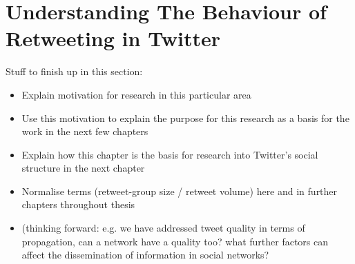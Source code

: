 \chapter{Understanding The Behaviour of Retweeting in Twitter}


Stuff to finish up in this section:
\begin{itemize}
\item Explain motivation for research in this particular area
\item Use this motivation to explain the purpose for this research as a basis for the work in the next few chapters
\item Explain how this chapter is the basis for research into Twitter's social structure in the next chapter
\item Normalise terms (retweet-group size / retweet volume) here and in further chapters throughout thesis
\item (thinking forward: e.g. we have addressed tweet quality in terms of propagation, can a network have a quality too? what further factors can affect the dissemination of information in social networks?
\end{itemize}

